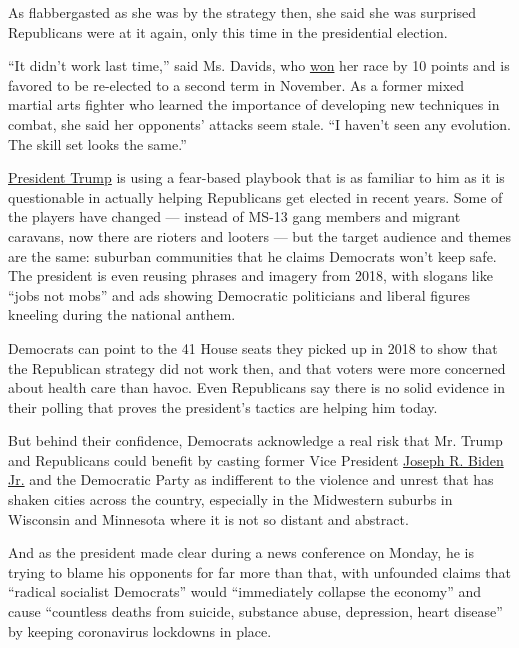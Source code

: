 As flabbergasted as she was by the strategy then, she said she was
surprised Republicans were at it again, only this time in the
presidential election.

``It didn't work last time,'' said Ms. Davids, who
\href{https://www.nytimes3xbfgragh.onion/elections/results/kansas-house-district-3}{won}
her race by 10 points and is favored to be re-elected to a second term
in November. As a former mixed martial arts fighter who learned the
importance of developing new techniques in combat, she said her
opponents' attacks seem stale. ``I haven't seen any evolution. The skill
set looks the same.''

\href{https://www.nytimes3xbfgragh.onion/interactive/2020/us/elections/donald-trump.html}{President
Trump} is using a fear-based playbook that is as familiar to him as it
is questionable in actually helping Republicans get elected in recent
years. Some of the players have changed --- instead of MS-13 gang
members and migrant caravans, now there are rioters and looters --- but
the target audience and themes are the same: suburban communities that
he claims Democrats won't keep safe. The president is even reusing
phrases and imagery from 2018, with slogans like ``jobs not mobs'' and
ads showing Democratic politicians and liberal figures kneeling during
the national anthem.

Democrats can point to the 41 House seats they picked up in 2018 to show
that the Republican strategy did not work then, and that voters were
more concerned about health care than havoc. Even Republicans say there
is no solid evidence in their polling that proves the president's
tactics are helping him today.

But behind their confidence, Democrats acknowledge a real risk that Mr.
Trump and Republicans could benefit by casting former Vice President
\href{https://www.nytimes3xbfgragh.onion/interactive/2020/us/elections/joe-biden.html}{Joseph
R. Biden Jr.} and the Democratic Party as indifferent to the violence
and unrest that has shaken cities across the country, especially in the
Midwestern suburbs in Wisconsin and Minnesota where it is not so distant
and abstract.

And as the president made clear during a news conference on Monday, he
is trying to blame his opponents for far more than that, with unfounded
claims that ``radical socialist Democrats'' would ``immediately collapse
the economy'' and cause ``countless deaths from suicide, substance
abuse, depression, heart disease'' by keeping coronavirus lockdowns in
place.

